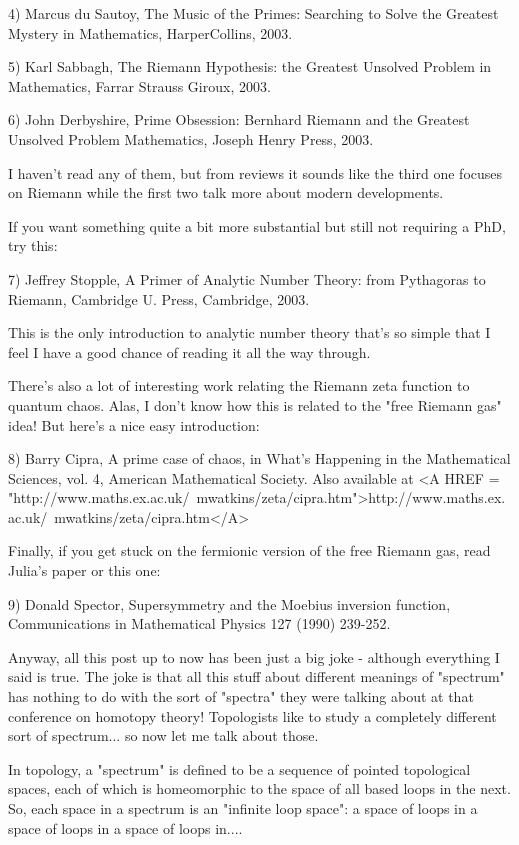 4) Marcus du Sautoy, The Music of the Primes: Searching to Solve the Greatest
Mystery in Mathematics, HarperCollins, 2003.

5) Karl Sabbagh, The Riemann Hypothesis: the Greatest Unsolved Problem
in Mathematics, Farrar Strauss \text{\&}  Giroux, 2003.

6) John Derbyshire, Prime Obsession: Bernhard Riemann and the Greatest 
Unsolved Problem Mathematics, Joseph Henry Press, 2003.

I haven't read any of them, but from reviews it sounds like the third
one focuses on Riemann while the first two talk more about modern
developments.

If you want something quite a bit more substantial but still not requiring
a PhD, try this:

7) Jeffrey Stopple, A Primer of Analytic Number Theory: from Pythagoras
to Riemann, Cambridge U. Press, Cambridge, 2003.

This is the only introduction to analytic number theory that's so simple that
I feel I have a good chance of reading it all the way through.

There's also a lot of interesting work relating the Riemann zeta
function to quantum chaos.  Alas, I don't know how this is related to
the "free Riemann gas" idea!  But here's a nice easy introduction:

8) Barry Cipra, A prime case of chaos, in What's Happening in the 
Mathematical Sciences, vol. 4, American Mathematical Society.  Also 
available at <A HREF = "http://www.maths.ex.ac.uk/~mwatkins/zeta/cipra.htm">http://www.maths.ex.ac.uk/~mwatkins/zeta/cipra.htm</A>

Finally, if you get stuck on the fermionic version of the free Riemann
gas, read Julia's paper or this one:

9) Donald Spector, Supersymmetry and the Moebius inversion function,
Communications in Mathematical Physics 127 (1990) 239-252.

Anyway, all this post up to now has been just a big joke - although everything
I said is true.  The joke is that all this stuff about different meanings of 
"spectrum" has nothing to do with the sort of "spectra" they were
talking about at that conference on homotopy theory!  Topologists like to
study a completely different sort of spectrum... so now let me talk about
those.
 
In topology, a "spectrum" is defined to be a sequence of pointed
topological spaces, each of which is homeomorphic to the space of all
based loops in the next.  So, each space in a spectrum is an "infinite
loop space": a space of loops in a space of loops in a space of loops
in....

